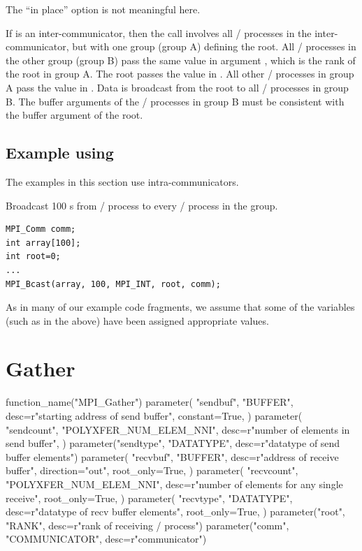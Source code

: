 The ``in place'' option is not meaningful here.

If  is an inter-communicator, then the call involves all
\MPI/ processes in the inter-communicator, but with one group (group A) defining the
root.  All \MPI/ processes in the other group (group B) pass the same value
in argument
, which is the rank of the root in group A.  The root
passes the value  in .
All other \MPI/ processes in group A pass the value  in
.
Data is broadcast from the root to all \MPI/ processes in group B.
The
buffer arguments of the \MPI/ processes in group B must be consistent with
the buffer argument of the root.

\subsection{Example using \texorpdfstring{}{MPI\_BCAST}}

The examples in this section use intra-communicators.

\begin{example}
\label{coll-exZ}
%
Broadcast 100 s from \MPI/ process  to every \MPI/ process in the group.

\begin{lstlisting}[language={[MPI]C}]
MPI_Comm comm;
int array[100];
int root=0;
...
MPI_Bcast(array, 100, MPI_INT, root, comm);
\end{lstlisting}
As in many of our example code fragments, we assume that some
of the variables (such as  in the above) have been assigned
appropriate values.
\end{example}

\section{Gather}
\label{sec:coll-gather}

\begin{mpi-binding}
    function_name("MPI_Gather")
    parameter(
        "sendbuf",
        "BUFFER",
        desc=r"starting address of send buffer",
        constant=True,
    )
    parameter(
        "sendcount",
        "POLYXFER_NUM_ELEM_NNI",
        desc=r"number of elements in send buffer",
    )
    parameter("sendtype", "DATATYPE", desc=r"datatype of send buffer elements")
    parameter(
        "recvbuf",
        "BUFFER",
        desc=r"address of receive buffer",
        direction="out",
        root_only=True,
    )
    parameter(
        "recvcount",
        "POLYXFER_NUM_ELEM_NNI",
        desc=r"number of elements for any single receive",
        root_only=True,
    )
    parameter(
        "recvtype",
        "DATATYPE",
        desc=r"datatype of recv buffer elements",
        root_only=True,
    )
    parameter("root", "RANK", desc=r"rank of receiving \MPI/ process")
    parameter("comm", "COMMUNICATOR", desc=r"communicator")
\end{mpi-binding}

